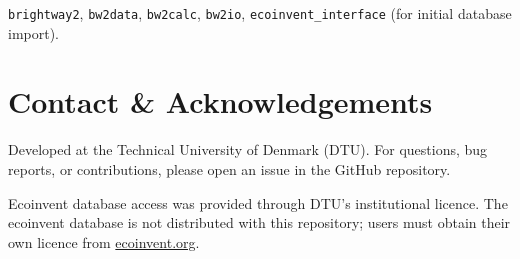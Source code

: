 \documentclass[12pt, a4paper]{article}
\begin{document}
\texttt{brightway2}, \texttt{bw2data}, \texttt{bw2calc}, \texttt{bw2io}, \texttt{ecoinvent\_interface} (for initial database import).

\section{Contact \& Acknowledgements}

Developed at the Technical University of Denmark (DTU). For questions, bug reports, or contributions, please open an issue in the GitHub repository.

Ecoinvent database access was provided through DTU's institutional licence. The ecoinvent database is not distributed with this repository; users must obtain their own licence from \href{https://ecoinvent.org}{ecoinvent.org}.
\end{document}
